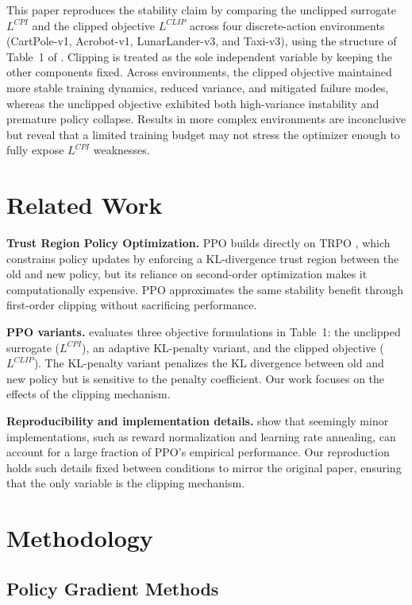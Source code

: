 \documentclass{article}
\begin{document}
This paper reproduces the stability claim by comparing the unclipped surrogate $L^{CPI}$ and the clipped objective $L^{CLIP}$ across four discrete-action environments (CartPole-v1, Acrobot-v1, LunarLander-v3, and Taxi-v3), using the structure of Table~1 of \citet{schulman2017ppo}. Clipping is treated as the sole independent variable by keeping the other components fixed. Across environments, the clipped objective maintained more stable training dynamics, reduced variance, and mitigated failure modes, whereas the unclipped objective exhibited both high-variance instability and premature policy collapse. Results in more complex environments are inconclusive but reveal that a limited training budget may not stress the optimizer enough to fully expose $L^{CPI}$ weaknesses.

\section{Related Work}

\textbf{Trust Region Policy Optimization.} PPO builds directly on TRPO \citep{schulman2017trpo}, which constrains policy updates by enforcing a KL-divergence trust region between the old and new policy, but its reliance on second-order optimization makes it computationally expensive. PPO approximates the same stability benefit through first-order clipping without sacrificing performance.

\textbf{PPO variants.} \citet{schulman2017ppo} evaluates three objective formulations in Table~1: the unclipped surrogate ($L^{CPI}$), an adaptive KL-penalty variant, and the clipped objective ($L^{CLIP}$). The KL-penalty variant penalizes the KL divergence between old and new policy but is sensitive to the penalty coefficient. Our work focuses on the effects of the clipping mechanism.

\textbf{Reproducibility and implementation details.} \citet{engstrom2020implementation} show that seemingly minor implementations, such as reward normalization and learning rate annealing, can account for a large fraction of PPO's empirical performance. Our reproduction holds such details fixed between conditions to mirror the original paper, ensuring that the only variable is the clipping mechanism.

\section{Methodology}

\subsection{Policy Gradient Methods}
\end{document}
